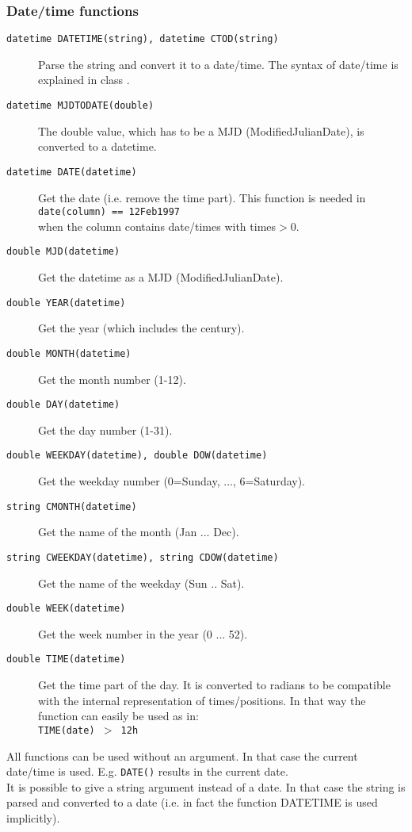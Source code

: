 \subsubsection{Date/time functions}
\begin{description}
  \item[ \texttt{datetime DATETIME(string),  datetime CTOD(string)} ]
       Parse the string and convert it to a date/time. The syntax of
       date/time is explained in class
       .
  \item[ \texttt{datetime MJDTODATE(double)} ]
       The double value, which has to be a MJD (ModifiedJulianDate), is
       converted to a datetime.
  \item[ \texttt{datetime DATE(datetime)}]
        Get the date (i.e. remove the time part). This function is needed in
       \\\texttt{date(column) == 12Feb1997}
       \\when the column contains date/times with times$>$0.
  \item[ \texttt{double MJD(datetime)}]
        Get the datetime as a MJD (ModifiedJulianDate).
  \item[ \texttt{double YEAR(datetime)}]
        Get the year (which includes the century).
  \item[ \texttt{double MONTH(datetime)}]
        Get the month number (1-12).
  \item[ \texttt{double DAY(datetime)}]
        Get the day number (1-31).
  \item[ \texttt{double WEEKDAY(datetime),  double DOW(datetime)}]
        Get the weekday number (0=Sunday, ..., 6=Saturday).
  \item[ \texttt{string CMONTH(datetime)}]
        Get the name of the month (Jan ... Dec).
  \item[ \texttt{string CWEEKDAY(datetime),  string CDOW(datetime)}]
        Get the name of the weekday (Sun .. Sat).
  \item[ \texttt{double WEEK(datetime)}]
        Get the week number in the year (0 ... 52).
  \item[ \texttt{double TIME(datetime)}]
       Get the time part of the day. It is converted to radians to
       be compatible with the internal representation of times/positions.
       In that way the function can easily be used as in:
       \\\texttt{TIME(date) $>$ 12h}
\end{description}
All functions can be used without an argument. In that case the current
date/time is used. E.g. \texttt{DATE()} results in the current date.
\\It is possible to give a string argument instead of a date. In that
case the string is parsed and converted to a date (i.e. in fact the
function DATETIME is used implicitly).
  
